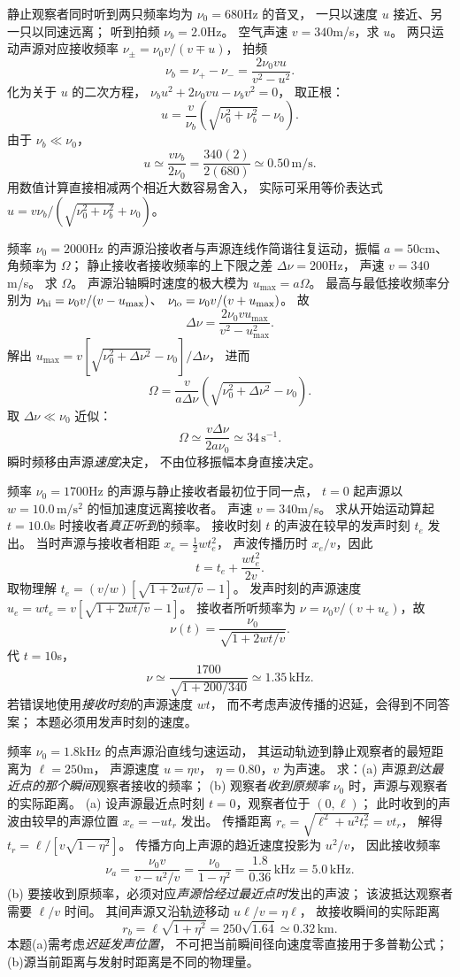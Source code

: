 静止观察者同时听到两只频率均为
$\nu_0=680$Hz 的音叉，
一只以速度 $u$ 接近、另一只以同速远离；
听到拍频
$\nu_b=2.0$Hz。
空气声速 $v=340$m/s，求 $u$。
\exsolution
两只运动声源对应接收频率
$\nu_\pm=\nu_0v/(v\mp u)$，
拍频
\[
\nu_b=\nu_+-\nu_-
=\frac{2\nu_0vu}{v^2-u^2}.
\]
化为关于 $u$ 的二次方程，
$\nu_bu^2+2\nu_0vu-\nu_bv^2=0$，
取正根：
\[
\boxed{u=\frac v{\nu_b}
\left(\sqrt{\nu_0^2+\nu_b^2}-\nu_0\right)}.
\]
由于 $\nu_b\ll\nu_0$，
\[
\boxed{u\simeq\frac{v\nu_b}{2\nu_0}
=\frac{340(2)}{2(680)}
\simeq0.50\,\mathrm{m/s}}.
\]
\excheck 用数值计算直接相减两个相近大数容易舍入，
实际可采用等价表达式
$u=v\nu_b/(\sqrt{\nu_0^2+\nu_b^2}+\nu_0)$。

频率 $\nu_0=2000$Hz 的声源沿接收者与声源连线作简谐往复运动，振幅 $a=50$cm、角频率为 $\Omega$；
静止接收者接收频率的上下限之差
$\Delta\nu=200$Hz，
声速 $v=340$m/s。
求 $\Omega$。
\exsolution
声源沿轴瞬时速度的极大模为
$u_{\max}=a\Omega$。
最高与最低接收频率分别为
$\nu_{\rm hi}=\nu_0v/(v-u_{\max})$、
$\nu_{\rm lo}=\nu_0v/(v+u_{\max})$。
故
\[
\Delta\nu=
\frac{2\nu_0v u_{\max}}{v^2-u_{\max}^2}.
\]
解出
$u_{\max}=v[\sqrt{\nu_0^2+\Delta\nu^2}-\nu_0]/\Delta\nu$，
进而
\[
\boxed{\Omega=\frac v{a\Delta\nu}
\left(\sqrt{\nu_0^2+\Delta\nu^2}-\nu_0\right)}.
\]
取 $\Delta\nu\ll\nu_0$ 近似：
\[
\boxed{\Omega\simeq\frac{v\Delta\nu}
{2a\nu_0}\simeq34\,\mathrm{s^{-1}}}.
\]
\excheck 瞬时频移由声源\emph{速度}决定，
不由位移振幅本身直接决定。

频率 $\nu_0=1700$Hz 的声源与静止接收者最初位于同一点，
$t=0$ 起声源以
$w=10.0\,\mathrm{m/s^2}$ 的恒加速度远离接收者。
声速 $v=340$m/s。
求从开始运动算起 $t=10.0$s 时接收者\emph{真正听到}的频率。
\exsolution
接收时刻 $t$ 的声波在较早的发声时刻
$t_e$ 发出。
当时声源与接收者相距
$x_e=\tfrac12wt_e^2$，
声波传播历时 $x_e/v$，因此
\[
t=t_e+\frac{wt_e^2}{2v}.
\]
取物理解
$t_e=(v/w)[\sqrt{1+2wt/v}-1]$。
发声时刻的声源速度
$u_e=wt_e=v[\sqrt{1+2wt/v}-1]$。
接收者所听频率为
$\nu=\nu_0v/(v+u_e)$，故
\[
\boxed{\nu(t)=
\frac{\nu_0}{\sqrt{1+2wt/v}}}.
\]
代 $t=10$s，
\[
\boxed{\nu\simeq
\frac{1700}{\sqrt{1+200/340}}
\simeq1.35\,\mathrm{kHz}}.
\]
\excheck 若错误地使用\emph{接收时刻}的声源速度 $wt$，
而不考虑声波传播的迟延，会得到不同答案；
本题必须用发声时刻的速度。

频率 $\nu_0=1.8$kHz 的点声源沿直线匀速运动，
其运动轨迹到静止观察者的最短距离为
$\ell=250$m，
声源速度 $u=\eta v$，
$\eta=0.80$，$v$ 为声速。
求：(a) 声源\emph{到达最近点的那个瞬间}观察者接收的频率；
(b) 观察者\emph{收到原频率} $\nu_0$ 时，声源与观察者的实际距离。
\exsolution
(a) 设声源最近点时刻 $t=0$，观察者位于 $(0,\ell)$；
此时收到的声波由较早的声源位置
$x_e=-ut_r$ 发出。
传播距离
$r_e=\sqrt{\ell^2+u^2t_r^2}=vt_r$，
解得
$t_r=\ell/[v\sqrt{1-\eta^2}]$。
传播方向上声源的趋近速度投影为
$u^2/v$，
因此接收频率
\[
\boxed{\nu_a=\frac{\nu_0v}{v-u^2/v}
=\frac{\nu_0}{1-\eta^2}
=\frac{1.8}{0.36}\,\mathrm{kHz}
=5.0\,\mathrm{kHz}}.
\]
(b) 要接收到原频率，必须对应\emph{声源恰经过最近点时}发出的声波；
该波抵达观察者需要 $\ell/v$ 时间。
其间声源又沿轨迹移动
$u\ell/v=\eta\ell$，
故接收瞬间的实际距离
\[
\boxed{r_b=\ell\sqrt{1+\eta^2}
=250\sqrt{1.64}\simeq0.32\,\mathrm{km}}.
\]
\excheck 本题(a)需考虑\emph{迟延发声位置}，
不可把当前瞬间径向速度零直接用于多普勒公式；
(b)源当前距离与发射时距离是不同的物理量。

